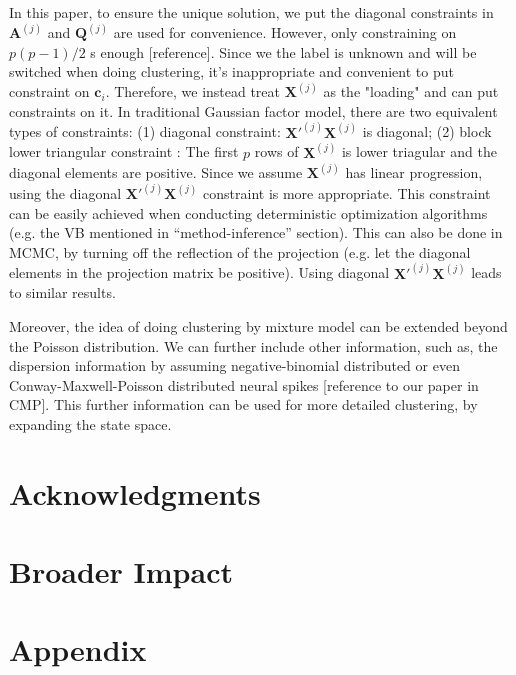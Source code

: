 \documentclass{article}
\begin{document}
	In this paper, to ensure the unique solution, we put the diagonal constraints in $\bm{A}^{(j)}$ and $\bm{Q}^{(j)}$ are used for convenience. However, only constraining on $p(p-1)/2$ s enough [reference]. Since we the label is unknown and will be switched when doing clustering, it’s inappropriate and convenient to put constraint on $\bm{c}_i$. Therefore, we instead treat $\bm{X}^{(j)}$ as the "loading" and can put constraints on it. In traditional Gaussian factor model, there are two equivalent types of constraints: (1) diagonal constraint: $\bm{X}'^{(j)}\bm{X}^{(j)}$ is diagonal; (2) block lower triangular constraint \citep{Fokoue2003}: The first $p$ rows of $\bm{X}^{(j)}$ is lower triagular and the diagonal elements are positive. Since we assume $\bm{X}^{(j)}$ has linear progression, using the diagonal $\bm{X}'^{(j)}\bm{X}^{(j)}$ constraint is more appropriate. This constraint can be easily achieved when conducting deterministic optimization algorithms (e.g. the VB mentioned in “method-inference” section). This can also be done in MCMC, by turning off the reflection of the projection (e.g. let the diagonal elements in the projection matrix be positive). Using diagonal $\bm{X}'^{(j)}\bm{X}^{(j)}$  leads to similar results.
	
	Moreover, the idea of doing clustering by mixture model can be extended beyond the Poisson distribution. We can further include other information, such as, the dispersion information by assuming negative-binomial distributed or even Conway-Maxwell-Poisson distributed neural spikes [reference to our paper in CMP]. This further information can be used for more detailed clustering, by expanding the state space.
	
	\section*{Acknowledgments}
	
	\section*{Broader Impact}
	
	\newpage
	{
		\small
		
	}
	
	
	\appendix
	
	\section{Appendix}
	
	
	
\end{document}
